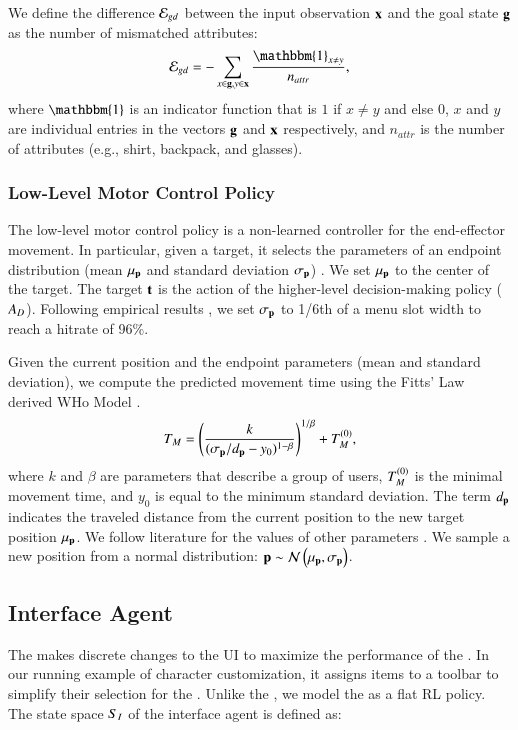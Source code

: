 We define the difference $\mathcal{E}_{gd}$ between the input observation $\mathbf{x}$ and the goal state $\mathbf{g}$ as the number of mismatched attributes:
\begin{equation}
    \error_{gd} = - \sum_{x \in \gattr, y \in \tools }\frac{\mathbbm{1}_{x \neq y}}{n_{attr}},
\end{equation}
where $\mathbbm{1}$ is an indicator function that is $1$ if $x\neq y$ and else $0$,  $x$ and $y$ are individual entries in the vectors $\mathbf{g}$ and $\mathbf{x}$ respectively, and $n_{attr}$ is the number of attributes (e.g., shirt, backpack, and glasses).  


\subsubsection{Low-Level Motor Control Policy}
\label{sec:ll}
The low-level motor control policy is a non-learned controller for the end-effector movement. In particular, given a target, it selects the parameters of an endpoint distribution (mean $\mu_{\mathbf{p}}$ and standard deviation $\sigma_{\mathbf{p}}$) . We set $\mu_{\mathbf{p}}$ to the center of the target. The target $\mathbf{t}$ is the action of the higher-level decision-making policy ($A_D$). 
Following empirical results \cite{fitts1954information}, we set $\sigma_{\mathbf{p}}$ to 1/6th of a menu slot width to reach a hitrate of 96\%.

Given the current position and the endpoint parameters (mean and standard deviation), we compute the predicted movement time using the Fitts' Law derived WHo Model \cite{guiard2015mathematical}.
\begin{equation}
        T_M = \left ( \frac{k}{(\sigma_{\mathbf{p}}/d_{\mathbf{p}}-y_0)^{1-\beta}} \right ) ^{1/\beta} + T_M^{(0)},
\end{equation}
where $k$ and $\beta$ are parameters that describe a group of users, $T_M^{(0)}$ is the minimal movement time, and $y_0$ is equal to the minimum standard deviation. The term $d_{\mathbf{p}}$ indicates the traveled distance from the current position to the new target position $\mu_{\mathbf{p}}$. We follow literature for the values of other parameters \cite{guiard2015mathematical, jokinen2021touchscreen}. We sample a new position from a normal distribution: $\mathbf{p} \sim \mathcal{N}\left(\mu_{\mathbf{p}}, \sigma_{\mathbf{p}}\right)$.


\subsection{Interface Agent}
The \interfaceagent makes discrete changes to the UI to maximize the performance of the \useragent. 
In our running example of character customization, it assigns items to a toolbar to simplify their selection for the \useragent.
Unlike the \useragent, we model the \interfaceagent as a flat RL policy. The state space $S_I$ of the interface agent is defined as:

